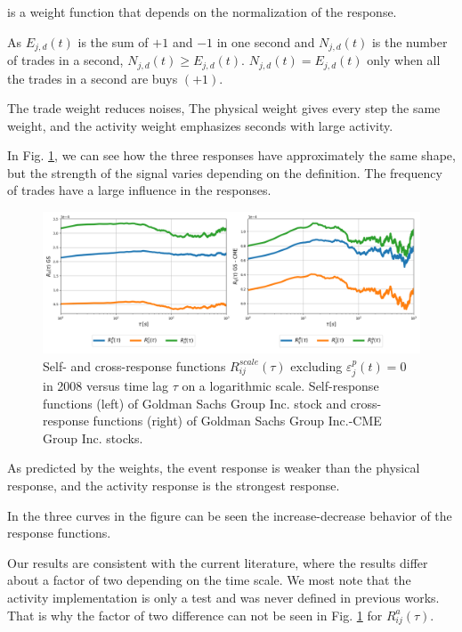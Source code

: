 is a weight function that depends on the normalization of the response.

As $E_{j,d}\left(t\right)$ is the sum of $+1$ and $-1$ in one second and
$N_{j,d}\left(t\right)$ is the number of trades in a second,
$N_{j,d}\left(t\right) \ge E_{j,d}\left(t\right)$.
$N_{j,d}\left(t\right) = E_{j,d}\left(t\right)$ only when all the trades in a
second are buys $(+1)$.

The trade weight reduces noises, The physical weight gives every step the same
weight, and the activity weight emphasizes seconds with large activity.

In Fig. \ref{fig:relation_responses}, we can see how the three
responses have approximately the same shape, but the strength of the signal
varies depending on the definition. The frequency of trades have a large
influence in the responses.

\begin{figure}[htbp]
    \centering
    \includegraphics[width=\textwidth]
    {figures/03_response_comparison_2008_GSi_CMEj.png}
    \caption{Self- and cross-response functions
             $R^{scale}_{ij}\left(\tau\right)$ excluding
             $\varepsilon^{p}_{j}\left(t\right) = 0$ in 2008 versus time lag
             $\tau$ on a logarithmic scale. Self-response functions (left) of
             Goldman Sachs Group Inc. stock and cross-response functions
             (right) of Goldman Sachs Group Inc.-CME Group Inc. stocks.}
    \label{fig:relation_responses}
\end{figure}

As predicted by the weights, the event response is weaker than the physical
response, and the activity response is the strongest response.

In the three curves in the figure can be seen the increase-decrease behavior of
the response functions.

Our results are consistent with the current literature, where the results
differ about a factor of two depending on the time scale. We most note that the
activity implementation is only a test and was never defined in previous works.
That is why the factor of two difference can not be seen in Fig.
\ref{fig:relation_responses} for $R_{ij}^{a} \left( \tau \right)$.
